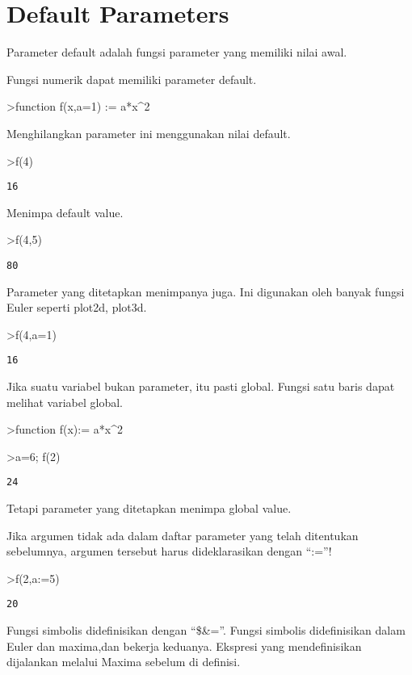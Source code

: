 \documentclass[
]{book}
\begin{document}
\section{Default Parameters}\label{default-parameters}

Parameter default adalah fungsi parameter yang memiliki nilai awal.

Fungsi numerik dapat memiliki parameter default.

\textgreater function f(x,a=1) := a*x\^{}2

Menghilangkan parameter ini menggunakan nilai default.

\textgreater f(4)

\begin{verbatim}
16
\end{verbatim}

Menimpa default value.

\textgreater f(4,5)

\begin{verbatim}
80
\end{verbatim}

Parameter yang ditetapkan menimpanya juga. Ini digunakan oleh banyak fungsi Euler seperti plot2d, plot3d.

\textgreater f(4,a=1)

\begin{verbatim}
16
\end{verbatim}

Jika suatu variabel bukan parameter, itu pasti global. Fungsi satu baris dapat melihat variabel global.

\textgreater function f(x):= a*x\^{}2

\textgreater a=6; f(2)

\begin{verbatim}
24
\end{verbatim}

Tetapi parameter yang ditetapkan menimpa global value.

Jika argumen tidak ada dalam daftar parameter yang telah ditentukan sebelumnya, argumen tersebut harus dideklarasikan dengan ``:=''!

\textgreater f(2,a:=5)

\begin{verbatim}
20
\end{verbatim}

Fungsi simbolis didefinisikan dengan ``\$\&=''. Fungsi simbolis didefinisikan dalam Euler dan maxima,dan bekerja keduanya. Ekspresi yang mendefinisikan dijalankan melalui Maxima sebelum di definisi.
\end{document}
